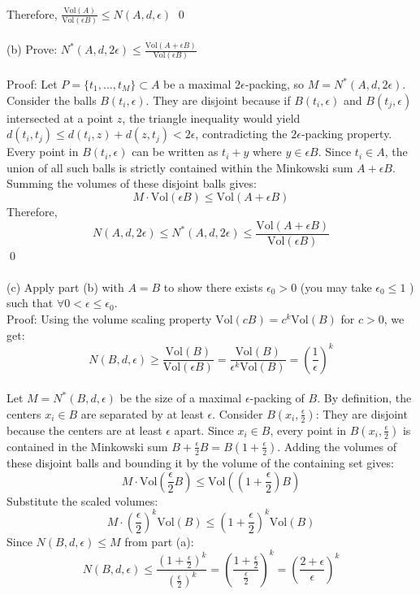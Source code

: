 \documentclass{article}
\begin{document}
\\
Therefore, $\frac{\text{Vol}(A)}{\text{Vol}(\epsilon B)} \leq N(A,d,\epsilon)$
\qed
\\
\\
(b) Prove: $N^*(A, d, 2\epsilon) \leq \frac{\text{Vol}(A + \epsilon B)}{\text{Vol}(\epsilon B)}$
\\
\\
Proof: Let $P = \{t_1, ..., t_M\} \subset A$ be a maximal $2\epsilon$-packing, so $M = N^*(A, d, 2\epsilon)$. Consider the balls $B(t_i, \epsilon)$. They are disjoint because if $B(t_i, \epsilon)$ and $B(t_j, \epsilon)$ intersected at a point $z$, the triangle inequality would yield $d(t_i, t_j) \leq d(t_i, z) + d(z, t_j) < 2\epsilon$, contradicting the $2\epsilon$-packing property.
\\
Every point in $B(t_i, \epsilon)$ can be written as $t_i + y$ where $y \in \epsilon B$. Since $t_i \in A$, the union of all such balls is strictly contained within the Minkowski sum $A + \epsilon B$. Summing the volumes of these disjoint balls gives:$$M \cdot \text{Vol}(\epsilon B) \leq \text{Vol}(A + \epsilon B)$$
Therefore, 
$$N(A, d, 2\epsilon) \leq N^*(A, d, 2\epsilon) \leq \frac{\text{Vol}(A + \epsilon B)}{\text{Vol}(\epsilon B)}$$ \qed
\\
\\
(c) Apply part (b) with $A = B$ to show there exists $\epsilon_0 > 0$ (you may take $\epsilon_0 \leq 1$ ) such that $\forall 0 < \epsilon \leq \epsilon_0$. 
\\
Proof:
Using the volume scaling property $\text{Vol}(c B) = c^k \text{Vol}(B)$ for $c > 0$, we get:$$N(B, d, \epsilon) \geq \frac{\text{Vol}(B)}{\text{Vol}(\epsilon B)} = \frac{\text{Vol}(B)}{\epsilon^k \text{Vol}(B)} = \left(\frac{1}{\epsilon}\right)^k$$
\\
Let $M = N^*(B, d, \epsilon)$ be the size of a maximal $\epsilon$-packing of $B$. By definition, the centers $x_i \in B$ are separated by at least $\epsilon$. Consider $B(x_i, \frac{\epsilon}{2})$: They are disjoint because the centers are at least $\epsilon$ apart. Since $x_i \in B$, every point in $B(x_i, \frac{\epsilon}{2})$ is contained in the Minkowski sum $B + \frac{\epsilon}{2}B = B(1+\frac{\epsilon}{2})$. Adding the volumes of these disjoint balls and bounding it by the volume of the containing set gives:$$M \cdot \text{Vol}\left(\frac{\epsilon}{2} B\right) \leq \text{Vol}\left(\left(1 + \frac{\epsilon}{2}\right)B\right)$$Substitute the scaled volumes:$$M \cdot \left(\frac{\epsilon}{2}\right)^k \text{Vol}(B) \leq \left(1 + \frac{\epsilon}{2}\right)^k \text{Vol}(B)$$ Since $N(B, d, \epsilon) \leq M$ from part (a):$$N(B, d, \epsilon) \leq \frac{(1 + \frac{\epsilon}{2})^k}{(\frac{\epsilon}{2})^k} = \left(\frac{1 + \frac{\epsilon}{2}}{\frac{\epsilon}{2}}\right)^k = \left(\frac{2 + \epsilon}{\epsilon}\right)^k$$
\end{document}
